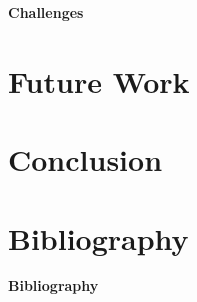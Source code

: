 \documentclass[xcolor=dvipsnames]{beamer}
\begin{document}
\begin{frame}{\bf Challenges}

\end{frame}

\section{Future Work}

\section{Conclusion}

\section{Bibliography}
\begin{frame}{\bf Bibliography}



\end{frame}
\end{document}
